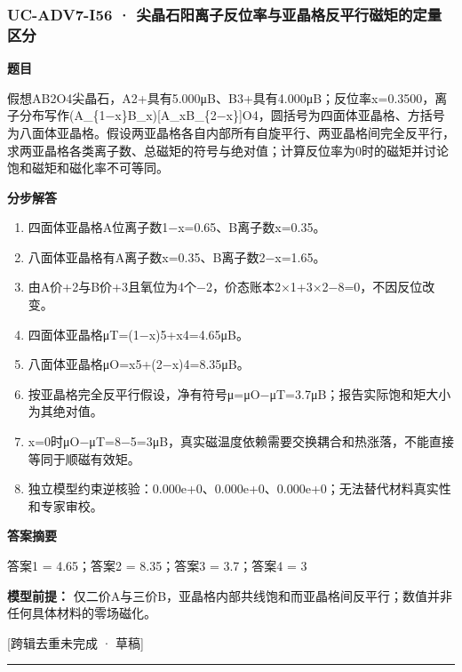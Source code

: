\documentclass[UTF8,11pt,a4paper]{ctexart}
\begin{document}
\subsubsection*{UC-ADV7-I56 · 尖晶石阳离子反位率与亚晶格反平行磁矩的定量区分}
\noindent\textbf{题目}\par
假想AB2O4尖晶石，A2+具有5.000μB、B3+具有4.000μB；反位率x=0.3500，离子分布写作(A\_\{1−x\}B\_x)[A\_xB\_\{2−x\}]O4，圆括号为四面体亚晶格、方括号为八面体亚晶格。假设两亚晶格各自内部所有自旋平行、两亚晶格间完全反平行，求两亚晶格各类离子数、总磁矩的符号与绝对值；计算反位率为0时的磁矩并讨论饱和磁矩和磁化率不可等同。\par
\medskip\noindent\textbf{分步解答}
\begin{enumerate}
\item 四面体亚晶格A位离子数1−x=0.65、B离子数x=0.35。
\item 八面体亚晶格有A离子数x=0.35、B离子数2−x=1.65。
\item 由A价+2与B价+3且氧位为4个−2，价态账本2×1+3×2−8=0，不因反位改变。
\item 四面体亚晶格μT=(1−x)5+x4=4.65μB。
\item 八面体亚晶格μO=x5+(2−x)4=8.35μB。
\item 按亚晶格完全反平行假设，净有符号μ=μO−μT=3.7μB；报告实际饱和矩大小为其绝对值。
\item x=0时μO−μT=8−5=3μB，真实磁温度依赖需要交换耦合和热涨落，不能直接等同于顺磁有效矩。
\item 独立模型约束逆核验：0.000e+0、0.000e+0、0.000e+0；无法替代材料真实性和专家审校。
\end{enumerate}
\noindent\textbf{答案摘要}\par
答案1 = 4.65；答案2 = 8.35；答案3 = 3.7；答案4 = 3\par
\noindent\textbf{模型前提：}
仅二价A与三价B，亚晶格内部共线饱和而亚晶格间反平行；数值并非任何具体材料的零场磁化。\par
\noindent\textcolor{red!65!black}{[跨辑去重未完成 · 草稿]} \par
\medskip\hrule\medskip
{}
\end{document}
